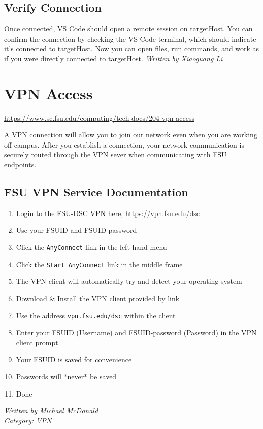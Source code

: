 \documentclass[12pt,a4paper]{article}
\begin{document}
\subsection*{Verify Connection}
Once connected, VS Code should open a remote session on targetHost. You can confirm the connection by checking the VS Code terminal, which should indicate it's connected to targetHost. Now you can open files, run commands, and work as if you were directly connected to targetHost.
\hfill \textit{Written by Xiaoguang Li}

\section{VPN Access}
\url{https://www.sc.fsu.edu/computing/tech-docs/204-vpn-access}

A VPN connection will allow you to join our network even when you are working off campus. After you establish a connection, your network communication is securely routed through the VPN sever when communicating with FSU endpoints.

\subsection*{FSU VPN Service Documentation}
\begin{enumerate}
    \item Login to the FSU-DSC VPN here, \url{https://vpn.fsu.edu/dsc}
    \item Use your FSUID and FSUID-password
    \item Click the \texttt{AnyConnect} link in the left-hand menu
    \item Click the \texttt{Start AnyConnect} link in the middle frame
    \item The VPN client will automatically try and detect your operating system
    \item Download \& Install the VPN client provided by link
    \item Use the address \texttt{vpn.fsu.edu/dsc} within the client
    \item Enter your FSUID (Username) and FSUID-password (Password) in the VPN client prompt
    \item Your FSUID is saved for convenience
    \item Passwords will *never* be saved
    \item Done
\end{enumerate}
\hfill \textit{Written by Michael McDonald} \\
\hfill \textit{Category: VPN}
\end{document}
